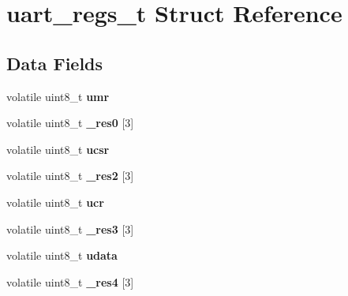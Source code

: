 \hypertarget{structuart__regs__t}{}\section{uart\+\_\+regs\+\_\+t Struct Reference}
\label{structuart__regs__t}
\subsection*{Data Fields}
\begin{DoxyCompactItemize}
\item 
\mbox{\label{structuart__regs__t_a056cf06cc9d3fee0b25aa03facb1f3df}} 
volatile uint8\+\_\+t {\bfseries umr}
\item 
\mbox{\label{structuart__regs__t_a1c65c0cecf341d939510054fedb86054}} 
volatile uint8\+\_\+t {\bfseries \+\_\+res0} \mbox{[}3\mbox{]}
\item 
\mbox{\label{structuart__regs__t_aeffce8db1fa9197d75e4d6ae78d3c9f1}} 
volatile uint8\+\_\+t {\bfseries ucsr}
\item 
\mbox{\label{structuart__regs__t_a41b3020bac2ac0a1daa55cb3b7709f8b}} 
volatile uint8\+\_\+t {\bfseries \+\_\+res2} \mbox{[}3\mbox{]}
\item 
\mbox{\label{structuart__regs__t_ae8c1e30fb156105faba214fb89abb080}} 
volatile uint8\+\_\+t {\bfseries ucr}
\item 
\mbox{\label{structuart__regs__t_a3d0ada499a82a48cb5a9248ff8c81c3d}} 
volatile uint8\+\_\+t {\bfseries \+\_\+res3} \mbox{[}3\mbox{]}
\item 
\mbox{\label{structuart__regs__t_a2037ad39bad0b77f4bcfff9a046909c2}} 
volatile uint8\+\_\+t {\bfseries udata}
\item 
\mbox{\label{structuart__regs__t_a7bc14ecdfacb1789851f62ba60270d43}} 
volatile uint8\+\_\+t {\bfseries \+\_\+res4} \mbox{[}3\mbox{]}
\item 
\mbox{\label{structuart__regs__t_adf1e9a36b8490bca5fbdc28f2b9ace9e}} 

\end{DoxyCompactItemize}
